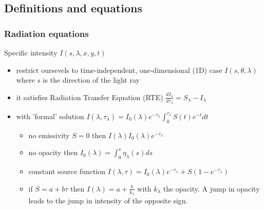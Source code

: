 \documentclass[../main/main.tex]{subfiles}
\begin{document}
\subsection{Definitions and equations}

\subsubsection{Radiation equations}
Specific intensity $I(s,\lambda,x,y,t)$ 
\begin{itemize}
\item restrict oursevels to time-independent, one-dimensional (1D) case $I(s,\theta,\lambda)$ where $s$ is the direction of the light ray
\item it satisfies Radiation Transfer Equation (RTE) 
$\boxed{\frac{dI_{\lambda}}{d\tau_{\lambda}} = S_{\lambda} - I_{\lambda}}$
\item with 'formal' solution 
$\boxed{I(\lambda,\tau_{\lambda}) = I_0(\lambda) e^{-\tau_{\lambda}}  \int_0^{\tau_{\lambda}}S(t)e^{-t} dt}$
\begin{itemize}
\item no emissivity $S=0$ then $I(\lambda) I_0(\lambda) e^{-\tau_{\lambda}}$
\item no opacity then $I_0(\lambda) = \int_0^{s} \eta_{\lambda}(s)ds$ 
\item constant source function $I(\lambda,\tau) = I_0(\lambda) e^{-\tau_{\lambda}} + S(1-e^{-\tau_{\lambda}})$
\item if $S=a+b\tau$ then $I(\lambda) = a+\frac{b}{k_{\lambda}}$ with $k_{\lambda}$ the opacity. A jump in opacity leads to the jump in intensity of the opposite sign.
\end{itemize}
\end{itemize}
\end{document}
